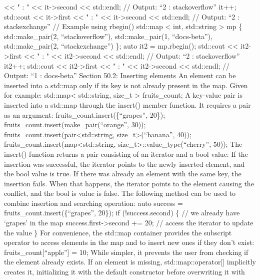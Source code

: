 \textless\textless{} " : " \textless\textless{} it-\textgreater second
\textless\textless{} std::endl; // Output: ``2 : stackoverflow'' it++;
std::cout \textless\textless{} it-\textgreater first
\textless\textless{} " : " \textless\textless{} it-\textgreater second
\textless\textless{} std::endl; // Output: ``2 : stackexchange'' //
Example using rbegin() std::map \textless{} int, std::string
\textgreater{} mp \{ std::make\_pair(2, ``stackoverflow''),
std::make\_pair(1, ``docs-beta''), std::make\_pair(2, ``stackexchange'')
\}; auto it2 = mp.rbegin(); std::cout \textless\textless{}
it2-\textgreater first \textless\textless{} " : " \textless\textless{}
it2-\textgreater second \textless\textless{} std::endl; // Output: ``2 :
stackoverflow'' it2++; std::cout \textless\textless{}
it2-\textgreater first \textless\textless{} " : " \textless\textless{}
it2-\textgreater second \textless\textless{} std::endl; // Output: ``1 :
docs-beta'' Section 50.2: Inserting elements An element can be inserted
into a std::map only if its key is not already present in the map. Given
for example: std::map\textless{} std::string, size\_t \textgreater{}
fruits\_count; A key-value pair is inserted into a std::map through the
insert() member function. It requires a pair as an argument:
fruits\_count.insert(\{``grapes'', 20\});
fruits\_count.insert(make\_pair(``orange'', 30));
fruits\_count.insert(pair\textless std::string,
size\_t\textgreater(``banana'', 40));
fruits\_count.insert(map\textless std::string,
size\_t\textgreater::value\_type(``cherry'', 50)); The insert() function
returns a pair consisting of an iterator and a bool value: If the
insertion was successful, the iterator points to the newly inserted
element, and the bool value is true. If there was already an element
with the same key, the insertion fails. When that happens, the iterator
points to the element causing the conﬂict, and the bool is value is
false. The following method can be used to combine insertion and
searching operation: auto success = fruits\_count.insert(\{``grapes'',
20\}); if (!success.second) \{ // we already have `grapes' in the map
success.first-\textgreater second += 20; // access the iterator to
update the value \} For convenience, the std::map container provides the
subscript operator to access elements in the map and to insert new ones
if they don't exist: fruits\_count{[}``apple''{]} = 10; While simpler,
it prevents the user from checking if the element already exists. If an
element is missing, std::map::operator{[}{]} implicitly creates it,
initializing it with the default constructor before overwriting it with
